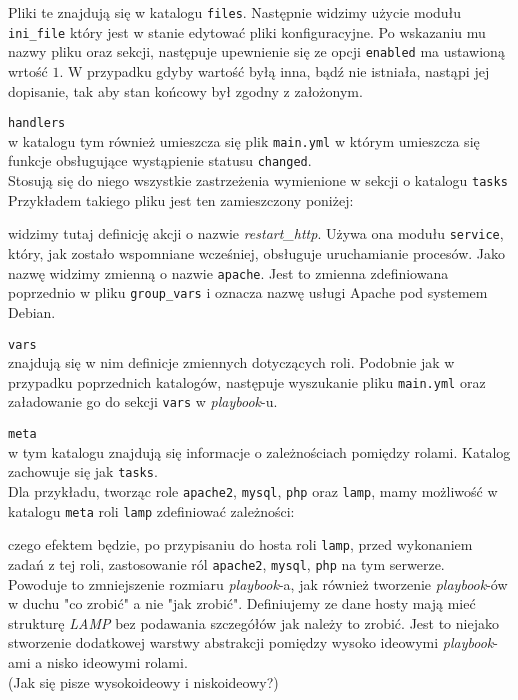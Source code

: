 \begin{description}
		Pliki te znajdują się w katalogu \texttt{files}.
		Następnie widzimy użycie modułu \texttt{ini\_file} który jest w stanie edytować pliki konfiguracyjne.
		Po wskazaniu mu nazwy pliku oraz sekcji, następuje upewnienie się ze opcji \texttt{enabled} ma ustawioną wrtość $1$.
		W przypadku gdyby wartość byłą inna, bądź nie istniała, nastąpi jej dopisanie, tak aby stan końcowy był zgodny z założonym.
	\item{\texttt{handlers}}\\
		w katalogu tym również umieszcza się plik \texttt{main.yml} w którym umieszcza się funkcje obsługujące wystąpienie statusu \texttt{changed}.\\
		Stosują się do niego wszystkie zastrzeżenia wymienione w sekcji o katalogu \texttt{tasks}
		Przykładem takiego pliku jest ten zamieszczony poniżej:
		
		widzimy tutaj definicję akcji o nazwie \textit{restart\_http}.
		Używa ona modułu \texttt{service}, który, jak zostało wspomniane wcześniej, obsługuje uruchamianie procesów.
		Jako nazwę widzimy zmienną o nazwie \texttt{apache}.
		Jest to zmienna zdefiniowana poprzednio w pliku \texttt{group\_vars} i oznacza nazwę usługi Apache pod systemem Debian.
	\item{\texttt{vars}}\\
		znajdują się w nim definicje zmiennych dotyczących roli.
		Podobnie jak w przypadku poprzednich katalogów, następuje wyszukanie pliku \texttt{main.yml} oraz załadowanie go do sekcji \texttt{vars} w \textit{playbook}-u.
	\item{\texttt{meta}}\\
		w tym katalogu znajdują się informacje o zależnościach pomiędzy rolami.
		Katalog zachowuje się jak \texttt{tasks}.\\
		Dla przykładu, tworząc role \texttt{apache2}, \texttt{mysql}, \texttt{php} oraz \texttt{lamp}, mamy możliwość w katalogu \texttt{meta} roli \texttt{lamp} zdefiniować zależności:
		
		czego efektem będzie, po przypisaniu do hosta roli \texttt{lamp}, przed wykonaniem zadań z tej roli, zastosowanie ról \texttt{apache2}, \texttt{mysql}, \texttt{php} na tym serwerze.\\
		Powoduje to zmniejszenie rozmiaru \textit{playbook}-a, jak również tworzenie \textit{playbook}-ów w duchu "co zrobić" a nie "jak zrobić".
		Definiujemy ze dane hosty mają mieć strukturę \textit{LAMP} bez podawania szczegółów jak należy to zrobić.
		Jest to niejako stworzenie dodatkowej warstwy abstrakcji pomiędzy wysoko ideowymi \textit{playbook}-ami a nisko ideowymi rolami.\\
		\LARGE (Jak się pisze wysokoideowy i niskoideowy?) \normalsize
\end{description}
